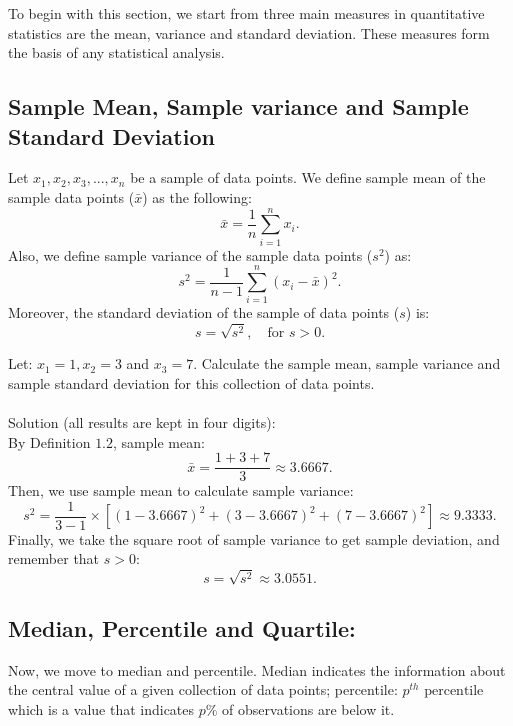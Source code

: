 To begin with this section, we start from three main measures in quantitative statistics are the mean, variance and standard deviation. These measures form the basis of any statistical analysis.\\

\subsection{Sample Mean, Sample variance and Sample Standard Deviation}

\begin{definition}
	Let $x_1, x_2, x_3, ..., x_n$ be a sample of data points. We define sample mean of the sample data points ($\bar{x}$) as the following: \[ \bar{x} = \frac{1}{n} \sum_{i=1}^{n} x_i.\] Also, we define sample variance of the sample data points ($s^2$) as: \[ s^2 = \frac{1}{n-1} \sum_{i=1}^{n}(x_i - \bar{x})^2.\] Moreover, the standard deviation of the sample of data points ($s$) is: \[ s = \sqrt{s^2}, \quad \text{for } s > 0.\]
\end{definition}
	
\begin{example}
Let: $x_1 = 1, x_2 = 3$ and $x_3 = 7$. Calculate the sample mean, sample variance and sample standard deviation for this collection of data points.\\

\\

Solution (all results are kept in four digits):\\
By Definition $1.2$, sample mean: \[ \bar{x} = \frac{1+3+7}{3} \approx 3.6667.\]
Then, we use sample mean to calculate sample variance: \[ s^2 = \frac{1}{3-1} \times [(1-3.6667)^2+(3-3.6667)^2+(7-3.6667)^2] \approx 9.3333.\]
Finally, we take the square root of sample variance to get sample deviation, and remember that $s > 0$: \[ s = \sqrt{s^2} \approx 3.0551.\]

\end{example}

\subsection{Median, Percentile and Quartile:}
	
Now, we move to median and percentile. Median indicates the information about the central value of a given collection of data points; percentile: $p^{th} \text{ percentile}$ which is a value that indicates $p \%$ of observations are below it.\\

